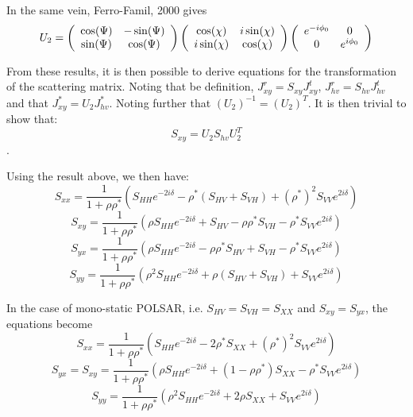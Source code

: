 In the same vein, Ferro-Famil, 2000 gives
\begin{equation}
U_2 = \left(
\begin{array}{c c}
 \cos(\Psi) & -\sin(\Psi) \\
 \sin(\Psi) & \cos(\Psi)
\end{array}
\right)
\left(
\begin{array}{c c}
 \cos(\chi) & i\sin(\chi) \\
 i\sin(\chi) & \cos(\chi)
\end{array}
\right)
\left(
\begin{array}{c c}
 e^{-i \phi_0} & 0 \\
 0 & e^{i \phi_0}
\end{array}
\right)    
\end{equation}

From these results, it is then possible to derive equations for the transformation of the scattering matrix.
Noting that be definition, $J_{xy}^r=S_{xy} J_{xy}^t$, $J_{hv}^r=S_{hv} J_{hv}^t$ 
and that $J_{xy}^*= U_2 J_{hv}^*$. 
Noting further that $(U_2)^{-1} = (U_2)^T$.
It is then trivial to show that:
\begin{equation}
S_{xy} = U_2 S_{hv} U_2^T
\end{equation}.

Using the result above, we then have:
\begin{equation}
S_{xx} = \frac{1}{1+\rho \rho^*} 
\left( 
S_{HH} e^{-2i\delta} - \rho^* (S_{HV}+S_{VH}) + (\rho^*)^2 S_{VV} e^{2i\delta}
\right)
\end{equation}
\begin{equation}
S_{xy} = \frac{1}{1+\rho \rho^*} 
\left( 
\rho S_{HH} e^{-2i\delta} + S_{HV} -\rho \rho^* S_{VH} - \rho^* S_{VV} e^{2i\delta}
\right)
\end{equation}
\begin{equation}
S_{yx} = \frac{1}{1+\rho \rho^*} 
\left( 
\rho S_{HH} e^{-2i\delta} - \rho \rho^* S_{HV} + S_{VH} - \rho^* S_{VV} e^{2i\delta}
\right)
\end{equation}
\begin{equation}
S_{yy} = \frac{1}{1+\rho \rho^*} 
\left( 
\rho^2 S_{HH} e^{-2i\delta} + \rho (S_{HV} + S_{VH}) + S_{VV} e^{2i\delta}
\right)
\end{equation}

In the case of mono-static POLSAR, i.e. $S_{HV}=S_{VH}=S_{XX}$ and $S_{xy}=S_{yx}$, the equations become
\begin{equation}
S_{xx} = \frac{1}{1+\rho \rho^*} 
\left( 
S_{HH} e^{-2i\delta} - 2 \rho^* S_{XX} + (\rho^*)^2 S_{VV} e^{2i\delta}
\right)
\end{equation}
\begin{equation}
S_{yx} = S_{xy}= \frac{1}{1+\rho \rho^*} 
\left( 
\rho S_{HH} e^{-2i\delta} + (1-\rho \rho^*) S_{XX} - \rho^* S_{VV} e^{2i\delta}
\right)
\end{equation}
\begin{equation}
S_{yy} = \frac{1}{1+\rho \rho^*} 
\left( 
\rho^2 S_{HH} e^{-2i\delta} + 2 \rho S_{XX} +  S_{VV} e^{2i\delta}
\right)
\end{equation}

